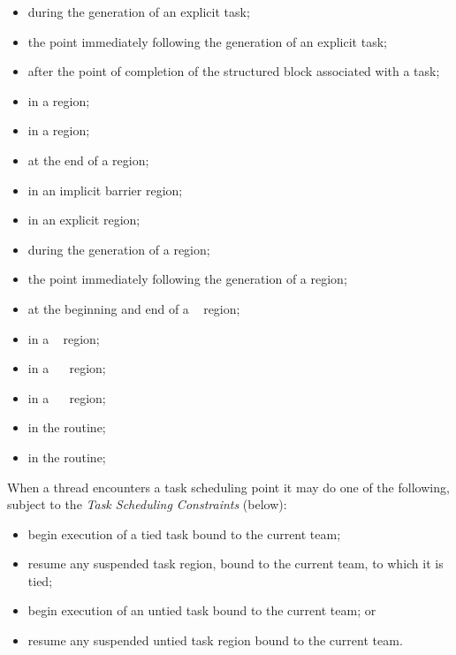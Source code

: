 \begin{itemize}
\item during the generation of an explicit task;

\item the point immediately following the generation of an explicit task;

\item after the point of completion of the structured block associated with a task;

\item in a  region;

\item in a  region;

\item at the end of a  region;

\item in an implicit barrier region;

\item in an explicit  region;

\item during the generation of a  region;

\item the point immediately following the generation of a  region;

\item at the beginning and end of a ~ region;

\item in a ~ region;

\item in a ~~ region;

\item in a ~~ region;

\item in the  routine;

\item in the  routine;
\end{itemize}

When a thread encounters a task scheduling point it may do one of the following,
subject to the \emph{Task Scheduling Constraints} (below):

\begin{itemize}
\item begin execution of a tied task bound to the current team;

\item resume any suspended task region, bound to the current team, to which it is tied;

\item begin execution of an untied task bound to the current team; or

\item resume any suspended untied task region bound to the current team.
\end{itemize}

